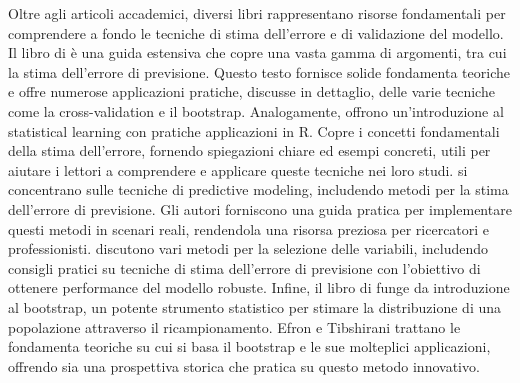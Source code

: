 Oltre agli articoli accademici, diversi libri rappresentano risorse fondamentali per comprendere a fondo le tecniche di stima dell'errore e di validazione del modello. Il libro di \textcite{elementsofstat} è una guida estensiva che copre una vasta gamma di argomenti, tra cui la stima dell'errore di previsione. Questo testo fornisce solide fondamenta teoriche e offre numerose applicazioni pratiche, discusse in dettaglio, delle varie tecniche come la cross-validation e il bootstrap. Analogamente, \textcite{introdtostatlearning} offrono un'introduzione al statistical learning con pratiche applicazioni in R. Copre i concetti fondamentali della stima dell'errore, fornendo spiegazioni chiare ed esempi concreti, utili per aiutare i lettori a comprendere e applicare queste tecniche nei loro studi. \textcite{appliedpredmodeling} si concentrano sulle tecniche di predictive modeling, includendo metodi per la stima dell'errore di previsione. Gli autori forniscono una guida pratica per implementare questi metodi in scenari reali, rendendola una risorsa preziosa per ricercatori e professionisti. \textcite{featureeng} discutono vari metodi per la selezione delle variabili, includendo consigli pratici su tecniche di stima dell'errore di previsione con l'obiettivo di ottenere performance del modello robuste. Infine, il libro di \textcite{efron1993} funge da introduzione al bootstrap, un potente strumento statistico per stimare la distribuzione di una popolazione attraverso il ricampionamento. Efron e Tibshirani trattano le fondamenta teoriche su cui si basa il bootstrap e le sue molteplici applicazioni, offrendo sia una prospettiva storica che pratica su questo metodo innovativo.
